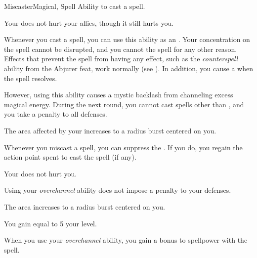     \begin{feat}{Miscaster}{Magical, Spell}
        \featpre Ability to cast a spell.
        \featben

         Your  does not hurt your allies, though it still hurts you.

         Whenever you cast a spell, you can use this ability as an .
        Your concentration on the spell cannot be disrupted, and you cannot  the spell for any other reason.
        Effects that prevent the spell from having any effect, such as the \textit{counterspell} ability from the Abjurer feat, work normally (see ).
        In addition, you cause a  when the spell resolves.

        However, using this ability causes a mystic backlash from channeling excess magical energy.
        During the next round, you cannot cast spells other than , and you take a  penalty to all defenses.

         The area affected by your  increases to a \areasmall radius burst centered on you.

         Whenever you miscast a spell, you can suppress the .
        If you do, you regain the action point spent to cast the spell (if any).

         Your  does not hurt you.

         Using your \textit{overchannel} ability does not impose a penalty to your defenses.

         The area increases to a \areamed radius burst centered on you.

         You gain  equal to 5 \add your level.

         When you use your \textit{overchannel} ability, you gain a  bonus to spellpower with the spell.
    \end{feat}

